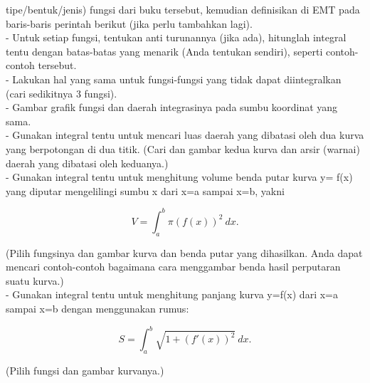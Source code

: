 \documentclass{article}
\begin{document}
\begin{eulernotebook}
\begin{eulercomment}
\begin{eulercomment}
\begin{eulercomment}
tipe/bentuk/jenis) fungsi dari buku tersebut, kemudian definisikan di
EMT pada baris-baris perintah berikut (jika perlu tambahkan lagi).\\
- Untuk setiap fungsi, tentukan anti turunannya (jika ada), hitunglah
integral tentu dengan batas-batas yang menarik (Anda tentukan
sendiri), seperti contoh-contoh tersebut.\\
- Lakukan hal yang sama untuk fungsi-fungsi yang tidak dapat
diintegralkan (cari sedikitnya 3 fungsi).\\
- Gambar grafik fungsi dan daerah integrasinya pada sumbu koordinat
yang sama.\\
- Gunakan integral tentu untuk mencari luas daerah yang dibatasi oleh
dua kurva yang berpotongan di dua titik. (Cari dan gambar kedua kurva
dan arsir (warnai) daerah yang dibatasi oleh keduanya.)\\
- Gunakan integral tentu untuk menghitung volume benda putar kurva y=
f(x) yang diputar mengelilingi sumbu x dari x=a sampai x=b, yakni

\end{eulercomment}
\begin{eulerformula}
\[
V = \int_a^b \pi (f(x))^2\ dx.
\]
\end{eulerformula}
\begin{eulercomment}
(Pilih fungsinya dan gambar kurva dan benda putar yang dihasilkan.
Anda dapat mencari contoh-contoh bagaimana cara menggambar benda hasil
perputaran suatu kurva.)\\
- Gunakan integral tentu untuk menghitung panjang kurva y=f(x) dari
x=a sampai x=b dengan menggunakan rumus:

\end{eulercomment}
\begin{eulerformula}
\[
S = \int_a^b \sqrt{1+(f'(x))^2} \ dx.
\]
\end{eulerformula}
\begin{eulercomment}
(Pilih fungsi dan gambar kurvanya.)


\end{eulercomment}
\end{eulercomment}
\end{eulercomment}
\end{eulernotebook}
\end{document}
